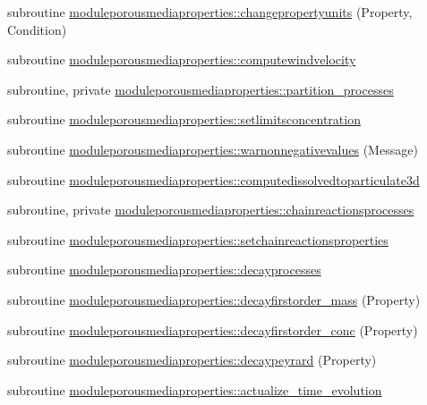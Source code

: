 \begin{DoxyCompactItemize}
subroutine \mbox{\hyperlink{namespacemoduleporousmediaproperties_a4f575711195b1879221a0c494292c90c}{moduleporousmediaproperties\+::changepropertyunits}} (Property, Condition)
\item 
subroutine \mbox{\hyperlink{namespacemoduleporousmediaproperties_aad02f0ad0e6d8ad5f7cd959e38c17fa7}{moduleporousmediaproperties\+::computewindvelocity}}
\item 
subroutine, private \mbox{\hyperlink{namespacemoduleporousmediaproperties_a8875ae5fa2c63a9d71875b7fd07addfb}{moduleporousmediaproperties\+::partition\+\_\+processes}}
\item 
subroutine \mbox{\hyperlink{namespacemoduleporousmediaproperties_aa132ced55703c339565649a0065925da}{moduleporousmediaproperties\+::setlimitsconcentration}}
\item 
subroutine \mbox{\hyperlink{namespacemoduleporousmediaproperties_a457fa586000763f38ce30bbaf81de100}{moduleporousmediaproperties\+::warnonnegativevalues}} (Message)
\item 
subroutine \mbox{\hyperlink{namespacemoduleporousmediaproperties_a2438c1ae6e14a9ddbc08eda6cd410daf}{moduleporousmediaproperties\+::computedissolvedtoparticulate3d}}
\item 
subroutine, private \mbox{\hyperlink{namespacemoduleporousmediaproperties_aa89aee3f1e3ab0673669acd8126824f9}{moduleporousmediaproperties\+::chainreactionsprocesses}}
\item 
subroutine \mbox{\hyperlink{namespacemoduleporousmediaproperties_a4eef1ed87ef643f7f98c8302286a6eb1}{moduleporousmediaproperties\+::setchainreactionsproperties}}
\item 
subroutine \mbox{\hyperlink{namespacemoduleporousmediaproperties_a09a5fbeb9b55249ae5b934510525a8ff}{moduleporousmediaproperties\+::decayprocesses}}
\item 
subroutine \mbox{\hyperlink{namespacemoduleporousmediaproperties_accf60e0dd2d0f11fb4815a77bd7db219}{moduleporousmediaproperties\+::decayfirstorder\+\_\+mass}} (Property)
\item 
subroutine \mbox{\hyperlink{namespacemoduleporousmediaproperties_a3c5193c49fa27b216424d2162798b41b}{moduleporousmediaproperties\+::decayfirstorder\+\_\+conc}} (Property)
\item 
subroutine \mbox{\hyperlink{namespacemoduleporousmediaproperties_a9e4d029f1da0a9fa9ea00b76a2a21ffd}{moduleporousmediaproperties\+::decaypeyrard}} (Property)
\item 
subroutine \mbox{\hyperlink{namespacemoduleporousmediaproperties_a2538954ade5763189d6d5f04ad4e7882}{moduleporousmediaproperties\+::actualize\+\_\+time\+\_\+evolution}}

\end{DoxyCompactItemize}

